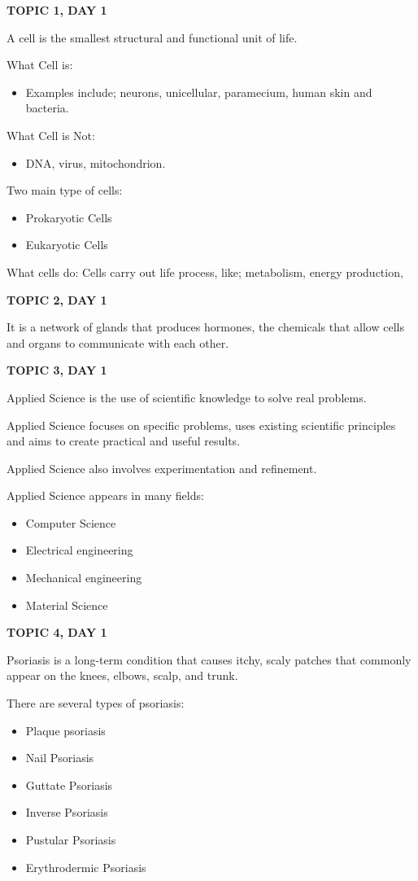 {{{\footnotesize
\textbf{TOPIC 1, DAY 1}


A cell is the smallest structural and functional unit of life.


What Cell is:
\begin{itemize}
    \item Examples include; neurons, unicellular, paramecium, human skin and bacteria.
\end{itemize}


What Cell is Not: 
\begin{itemize}
    \item DNA, virus, mitochondrion.
\end{itemize}


Two main type of cells:
\begin{itemize}
    \item Prokaryotic Cells
    \item Eukaryotic Cells
\end{itemize}


What cells do:
Cells carry out life process, like; metabolism, energy production, 

\textbf{TOPIC 2, DAY 1}


It is a network of glands that produces hormones, the chemicals that allow cells and organs to communicate with each other. 

\textbf{TOPIC 3, DAY 1}


Applied Science is the use of scientific knowledge to solve real problems. 


Applied Science focuses on specific problems, uses existing scientific principles and aims to create practical and useful results.


Applied Science also involves experimentation and refinement. 


Applied Science appears in many fields: 
\begin{itemize}
    \item Computer Science 
    \item Electrical engineering 
    \item Mechanical engineering 
    \item Material Science
\end{itemize}

\textbf{TOPIC 4, DAY 1}


Psoriasis is a long-term condition that causes itchy, scaly patches that commonly appear on the knees, elbows, scalp, and trunk. 


There are several types of psoriasis:
\begin{itemize}
    \item Plaque psoriasis
    \item Nail Psoriasis 
    \item Guttate Psoriasis 
    \item Inverse Psoriasis 
    \item Pustular Psoriasis 
    \item Erythrodermic Psoriasis 
\end{itemize}

}}}
